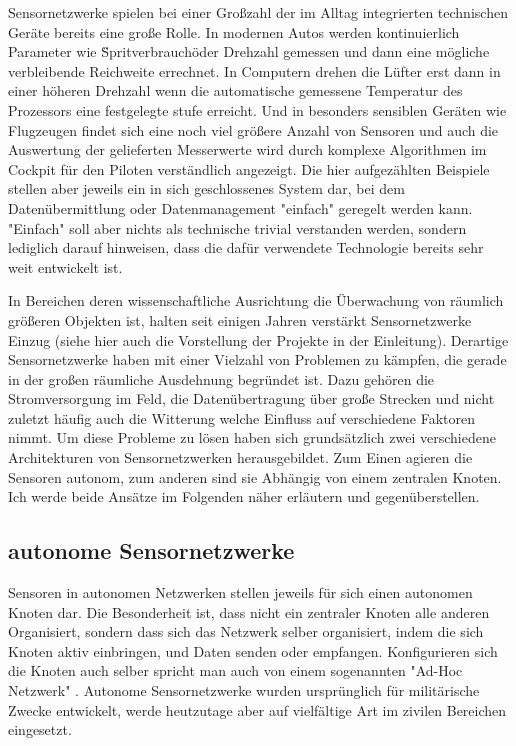 Sensornetzwerke spielen bei einer Großzahl der im Alltag integrierten technischen Geräte bereits eine große Rolle. In modernen Autos werden kontinuierlich Parameter wie \"Spritverbrauch\" oder Drehzahl gemessen und dann eine mögliche verbleibende Reichweite errechnet. In Computern drehen die Lüfter erst dann in einer höheren Drehzahl wenn die automatische gemessene Temperatur des Prozessors eine festgelegte stufe erreicht. Und in besonders sensiblen Geräten wie Flugzeugen findet sich eine noch viel größere Anzahl von Sensoren und auch die Auswertung der gelieferten Messerwerte wird durch komplexe Algorithmen im Cockpit für den Piloten verständlich angezeigt. Die hier aufgezählten Beispiele stellen aber jeweils ein in sich geschlossenes System dar, bei dem Datenübermittlung oder Datenmanagement "einfach" geregelt werden kann. "Einfach" soll aber nichts als technische trivial verstanden werden, sondern lediglich darauf hinweisen, dass die dafür verwendete Technologie bereits sehr weit entwickelt ist. 

In Bereichen deren wissenschaftliche Ausrichtung die Überwachung von räumlich größeren Objekten ist, halten seit einigen Jahren verstärkt Sensornetzwerke Einzug (siehe hier auch die Vorstellung der Projekte in der Einleitung). Derartige Sensornetzwerke haben mit einer Vielzahl von Problemen zu kämpfen, die gerade in der großen räumliche Ausdehnung begründet ist. Dazu gehören die Stromversorgung im Feld, die Datenübertragung über große Strecken und nicht zuletzt häufig auch die Witterung welche Einfluss auf verschiedene Faktoren nimmt. Um diese Probleme zu lösen haben sich grundsätzlich zwei verschiedene Architekturen von Sensornetzwerken herausgebildet. Zum Einen agieren die Sensoren autonom, zum anderen sind sie Abhängig von einem zentralen Knoten. Ich werde beide Ansätze im Folgenden näher erläutern und gegenüberstellen.

\subsection{autonome Sensornetzwerke}
Sensoren in autonomen Netzwerken stellen jeweils für sich einen autonomen Knoten dar. Die Besonderheit ist, dass nicht ein zentraler Knoten alle anderen Organisiert, sondern dass sich das Netzwerk selber organisiert, indem die sich Knoten aktiv einbringen, und Daten senden oder empfangen. Konfigurieren sich die Knoten auch selber spricht man auch von einem sogenannten "Ad-Hoc Netzwerk" \citep{voigt_illustration_2013}. Autonome Sensornetzwerke wurden ursprünglich für militärische Zwecke entwickelt, werde heutzutage aber auf vielfältige Art im zivilen Bereichen eingesetzt.

